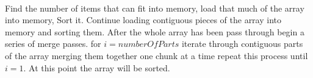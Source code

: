 \documentclass[11pt]{article}
\begin{document}
	\\
	Find the number of items that can fit into memory, load that much of the array into memory, Sort it. Continue loading contiguous pieces of the array into memory and sorting them. After the whole array has been pass through begin a series of merge passes. for $i = numberOfParts$ iterate through contiguous parts of the array merging them together one chunk at a time repeat this process until $i=1$. At this point the array will be sorted.
	
\end{document}
